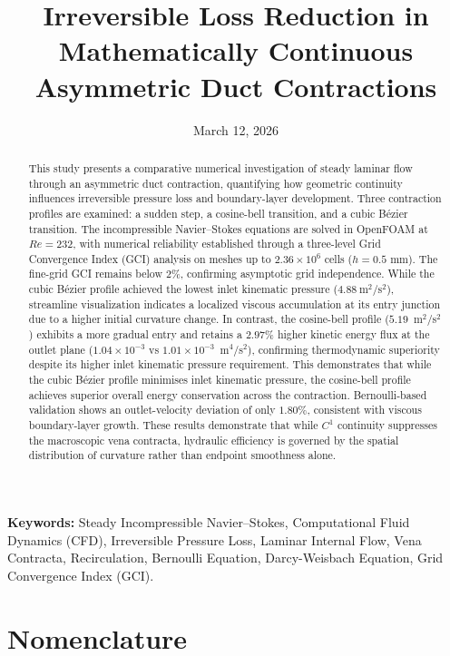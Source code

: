 \documentclass[12pt, a4paper]{article}
\title{Irreversible Loss Reduction in Mathematically Continuous Asymmetric Duct Contractions}
\date{March 12, 2026}
\begin{document}
\maketitle

\begin{abstract}
	This study presents a comparative numerical investigation of steady laminar flow through an asymmetric duct contraction, quantifying how geometric continuity influences irreversible pressure loss and boundary-layer development. Three contraction profiles are examined: a sudden step, a cosine-bell transition, and a cubic Bézier transition. The incompressible Navier--Stokes equations are solved in OpenFOAM at $Re=232$, with numerical reliability established through a three-level Grid Convergence Index (GCI) analysis on meshes up to $2.36 \times 10^6$ cells ($h=0.5$ mm). The fine-grid GCI remains below $2\%$, confirming asymptotic grid independence. While the cubic Bézier profile achieved the lowest inlet kinematic pressure ($4.88\ \mathrm{m^2/s^2}$), streamline visualization indicates a localized viscous accumulation at its entry junction due to a higher initial curvature change. In contrast, the cosine-bell profile ($5.19$~m$^2$/s$^2$) exhibits a more gradual entry 
	and retains a $2.97\%$ higher kinetic energy flux at the outlet plane 
	($1.04 \times 10^{-3}$ vs $1.01 \times 10^{-3}$~m$^4$/s$^2$), confirming 
	thermodynamic superiority despite its higher inlet kinematic pressure requirement. 
	This demonstrates that while the cubic B\'{e}zier profile minimises inlet 
	kinematic pressure, the cosine-bell profile achieves superior overall energy 
    conservation across the contraction. Bernoulli-based validation shows an outlet-velocity deviation of only $1.80\%$, consistent with viscous boundary-layer growth. These results demonstrate that while $C^1$ continuity suppresses the macroscopic vena contracta, hydraulic efficiency is governed by the spatial distribution of curvature rather than endpoint smoothness alone.
	\end{abstract}


\vspace{0.5cm}
\noindent \textbf{Keywords:}  Steady Incompressible Navier–Stokes, Computational Fluid Dynamics (CFD), Irreversible Pressure Loss, Laminar Internal Flow, Vena Contracta, Recirculation, Bernoulli Equation, Darcy-Weisbach Equation, Grid Convergence Index (GCI).

\newpage

\section*{Nomenclature}
\end{document}
